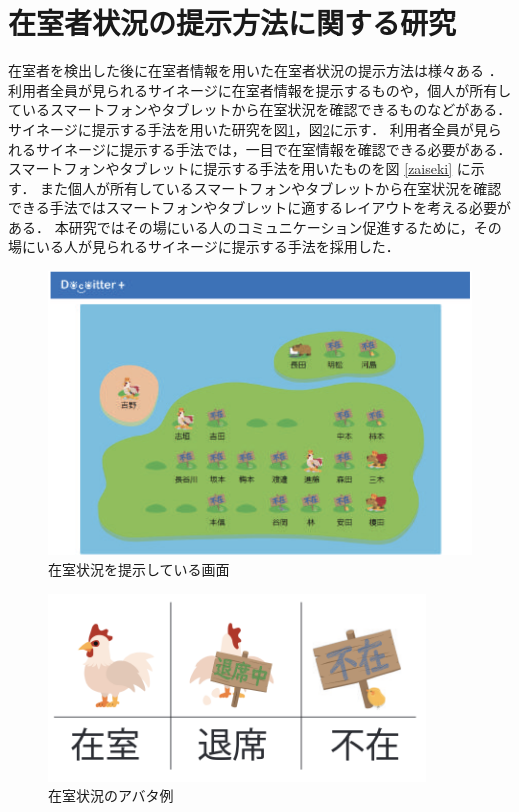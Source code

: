 \section{在室者状況の提示方法に関する研究}\label{2.3}
在室者を検出した後に在室者情報を用いた在室者状況の提示方法は様々ある
\cite{picture}
\cite{iptelephone}
\cite{staycomment}
\cite{kasika}
\cite{zaiseki}．
利用者全員が見られるサイネージに在室者情報を提示するものや，個人が所有しているスマートフォンやタブレットから在室状況を確認できるものなどがある．
サイネージに提示する手法を用いた研究を図\ref{staystate}\cite{kasika}，図\ref{stayniwatori}\cite{kasika}に示す．
利用者全員が見られるサイネージに提示する手法では，一目で在室情報を確認できる必要がある．
スマートフォンやタブレットに提示する手法を用いたものを図
\ref{zaiseki}
\cite{zaiseki}
に示す．
また個人が所有しているスマートフォンやタブレットから在室状況を確認できる手法ではスマートフォンやタブレットに適するレイアウトを考える必要がある．
本研究ではその場にいる人のコミュニケーション促進するために，その場にいる人が見られるサイネージに提示する手法を採用した．
\begin{figure}[H]
  \begin{center}
    \includegraphics[width=160mm]{image/staystate.png}
    \caption{在室状況を提示している画面\cite{kasika}}
    \label{staystate}
  \end{center}
\end{figure}
\begin{figure}[H]
  \begin{center}
    \includegraphics[width=100mm]{image/stayniwatori.png}
    \caption{在室状況のアバタ例\cite{kasika}}
    \label{stayniwatori}
  \end{center}
\end{figure}

